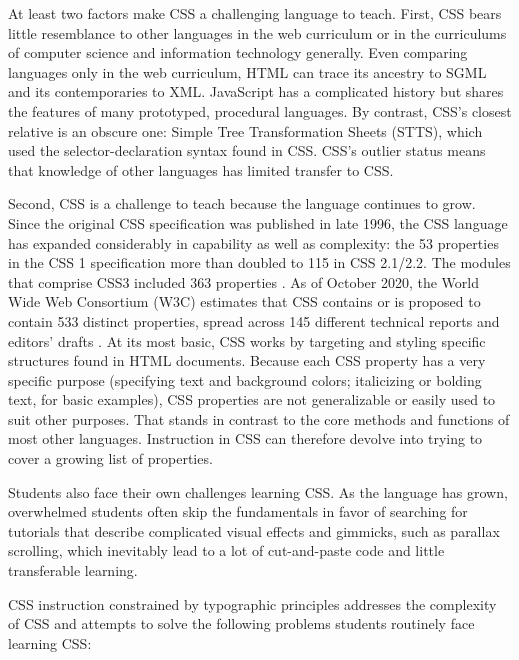 \documentclass[sigplan,screen]{acmart}
\begin{document}
At least two factors make CSS a challenging language to teach. First, CSS bears little resemblance to other languages in the web curriculum or in the curriculums of computer science and information technology generally. Even comparing languages only in the web curriculum, HTML can trace its ancestry to SGML and its contemporaries to XML. JavaScript has a complicated history but shares the features of many prototyped, procedural languages. By contrast, CSS’s closest relative is an obscure one: Simple Tree Transformation Sheets (STTS)\cite{w3c:briefhistory}, which used the selector-declaration syntax found in CSS. CSS's outlier status means that knowledge of other languages has limited transfer to CSS.

Second, CSS is a challenge to teach because the language continues to grow. Since the original CSS specification was published in late 1996, the CSS language has expanded considerably in capability as well as complexity: the 53 properties in the CSS 1 specification more than doubled to 115 in CSS 2.1/2.2. The modules that comprise CSS3 included  363 properties \cite{jom:css}. As of October 2020, the World Wide Web Consortium (W3C) estimates that CSS contains or is proposed to contain 533 distinct properties, spread across 145 different technical reports and editors' drafts \cite{w3c:iop}. At its most basic, CSS works by targeting and styling specific structures found in HTML documents. Because each CSS property has a very specific purpose (specifying text and background colors; italicizing or bolding text, for basic examples), CSS properties are not generalizable or easily used to suit other purposes. That stands in contrast to the core methods and functions of most other languages. Instruction in CSS can therefore devolve into trying to cover a growing list of properties.

 Students also face their own challenges learning CSS. As the language has grown, overwhelmed students often skip the fundamentals in favor of searching for tutorials that describe complicated visual effects and gimmicks, such as parallax scrolling, which inevitably lead to a lot of cut-and-paste code and little transferable learning.

CSS instruction constrained by typographic principles addresses the  complexity of CSS and attempts to solve the following problems students routinely face learning CSS:
\end{document}
